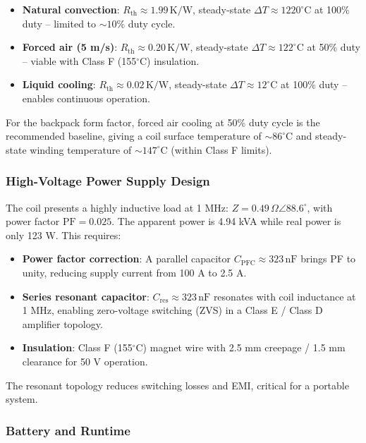 \begin{itemize}
    \item \textbf{Natural convection}: $R_{\text{th}} \approx 1.99\,\text{K/W}$, steady-state $\Delta T \approx 1220^\circ\text{C}$ at 100\% duty -- limited to $\sim 10\%$ duty cycle.
    \item \textbf{Forced air (5 m/s)}: $R_{\text{th}} \approx 0.20\,\text{K/W}$, steady-state $\Delta T \approx 122^\circ\text{C}$ at 50\% duty -- viable with Class F (155$^\circ$C) insulation.
    \item \textbf{Liquid cooling}: $R_{\text{th}} \approx 0.02\,\text{K/W}$, steady-state $\Delta T \approx 12^\circ\text{C}$ at 100\% duty -- enables continuous operation.
\end{itemize}

For the backpack form factor, forced air cooling at 50\% duty cycle is the recommended baseline, giving a coil surface temperature of $\sim 86^\circ\text{C}$ and steady-state winding temperature of $\sim 147^\circ\text{C}$ (within Class F limits).

\subsubsection{High-Voltage Power Supply Design}

The coil presents a highly inductive load at 1 MHz: $Z = 0.49\,\Omega \angle 88.6^\circ$, with power factor $\text{PF} = 0.025$. The apparent power is 4.94 kVA while real power is only 123 W. This requires:

\begin{itemize}
    \item \textbf{Power factor correction}: A parallel capacitor $C_{\text{PFC}} \approx 323\,\text{nF}$ brings PF to unity, reducing supply current from 100 A to 2.5 A.
    \item \textbf{Series resonant capacitor}: $C_{\text{res}} \approx 323\,\text{nF}$ resonates with coil inductance at 1 MHz, enabling zero-voltage switching (ZVS) in a Class E / Class D amplifier topology.
    \item \textbf{Insulation}: Class F (155$^\circ$C) magnet wire with 2.5 mm creepage / 1.5 mm clearance for 50 V operation.
\end{itemize}

The resonant topology reduces switching losses and EMI, critical for a portable system.

\subsubsection{Battery and Runtime}

